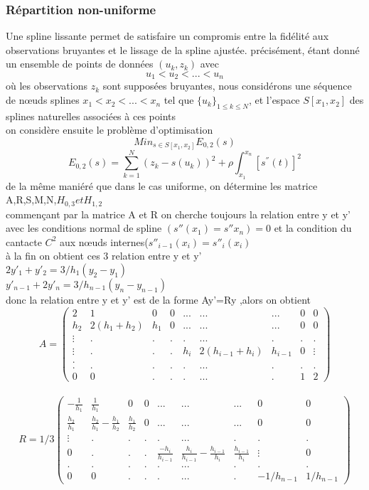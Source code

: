 \documentclass[a4paper,12pt]{article} %
\begin{document}
			\subsubsection{Répartition non-uniforme}
			    Une spline lissante permet de satisfaire un compromis entre la fidélité aux observations bruyantes et le lissage de la spline ajustée. précisément, étant donné un ensemble de points de données $(u_k,z_k)$ avec $$u_{1}<u_{2}< ... <u_{n}$$
                où les observations $z_k$ sont supposées bruyantes, nous considérons une séquence de nœuds splines $x_{1}< x_{2}<... < x_{n}$
                tel que $\{{u_k}\}_{1 \leq k \leq N}$, et l'espace $S[x_1,x_2]$ des splines naturelles associées à ces points \\
                on considère ensuite le problème d'optimisation $$Min_{s \in S[x_1,x_2]}E_{0,2}(s)$$
                $$E_{0,2}(s)=\sum_{k=1}^{N}(z_k-s(u_k))^2+\rho\int_{x_1}^{x_n}[s^{''}(t)]^2$$
                de la même maniéré que dans le cas uniforme, on détermine les matrice A,R,S,M,N,$H_{0,3} et H_{1,2}$\\
                commençant par la matrice A et R on cherche toujours la relation entre y et y' avec les conditions normal de  spline 
                $(s''(x_1)=s''x_n)=0$ et la condition du cantacte $C^2$ aux nœuds internes($s''_{i-1}(x_i)=s''_i(x_i)$\\
                à la fin on obtient ces 3 relation entre y et y'\\
                $2y'_1+y'_2=3/h_1(y_2-y_1)$\\
                $y'_{n-1}+2y'_n=3/h_{n-1}(y_n-y_{n-1})$\\
                donc la relation entre y et y' est de la forme Ay'=Ry ,alors on obtient \\
                $$A=\begin{pmatrix} 2&1&0&0&...&...&...&0&0 \\ h_2&2(h_1+h_2)&h_1&0&...&...&...&0&0 \\ \vdots&.&.&.&.&...&.&.&.\\ \vdots&.&.&.&h_i&2(h_{i-1}+h_i)&h_{i-1}&0&\vdots \\. \\.&.&.&.&.&...&.&.&. \\ 0&0&.&.&.&...&.&1&2 \end{pmatrix}$$\\
                
                $$R=1/3\begin{pmatrix} -\frac{1}{h_1}&\frac{1}{h_1}&0&0&...&...&...&0&0 \\ \frac{h_2}{h_1}&\frac{h_2}{h_1}-\frac{h_1}{h_2}&\frac{h_1}{h_2}&0&...&...&...&0&0 \\ \vdots&.&.&.&.&...&.&.&.\\ 0&.&.&.&\frac{-h_i}{h_{i-1}}&\frac{h_i}{h_{i-1}}-\frac{h_{i-1}}{h_i}&\frac{h_{i-1}}{h_i}&\vdots&0 \\.&.&.&.&.&...&.&.&. \\ 0&0&.&.&.&...&.&-1/h_{n-1}&1/h_{n-1} \end{pmatrix}$$
                
\end{document}

